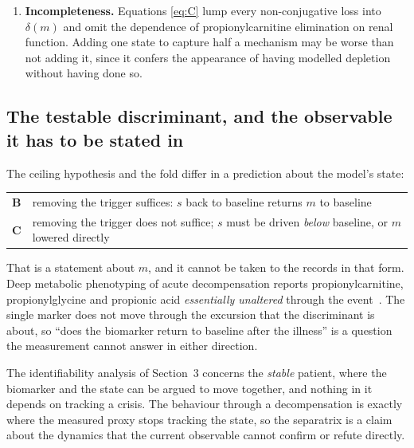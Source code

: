 \begin{enumerate}[leftmargin=*, itemsep=2pt]
      one~\cite{octn2_renal_transport}. %
      No measurement in patients establishes that the recovered fraction of filtered
      carnitine falls with the metabolite. What patients supply is the direction of absolute
      excretion, which the model matches, and that is the weaker test.
\item \textbf{Incompleteness.} Equations \eqref{eq:C} lump every non-conjugative loss into
      $\delta(m)$ and omit the dependence of propionylcarnitine elimination on renal
      function. Adding one state to capture half a mechanism may be worse than not adding
      it, since it confers the appearance of having modelled depletion without having done
      so.
\end{enumerate}

\subsection{The testable discriminant, and the observable it has to be stated in}
\label{sec:discriminant_appendix}

The ceiling hypothesis and the fold differ in a prediction about the model's state:

\begin{center}
\begin{tabular}{@{}ll@{}}
\toprule
\textbf{B} & removing the trigger suffices: $s$ back to baseline returns $m$ to baseline \\
\textbf{C} & removing the trigger does not suffice; $s$ must be driven \emph{below} baseline,
             or $m$ lowered directly \\
\bottomrule
\end{tabular}
\end{center}

That is a statement about $m$, and it cannot be taken to the records in that form. Deep
metabolic phenotyping of acute decompensation reports propionylcarnitine, propionylglycine
and propionic acid \emph{essentially unaltered} through the event~\cite{amd_phenotyping}. %
The single marker does not move through the excursion that the discriminant is about, so
``does the biomarker return to baseline after the illness'' is a question the measurement
cannot answer in either direction.

\begin{remark}[Scope]
\label{rem:scope_appendix}
The identifiability analysis of Section~3 concerns the \emph{stable} patient, where the
biomarker and the state can be argued to move together, and nothing in it depends on
tracking a crisis. The behaviour through a decompensation is exactly where the measured
proxy stops tracking the state, so the separatrix is a claim about the dynamics that
the current observable cannot confirm or refute directly.
\end{remark}

